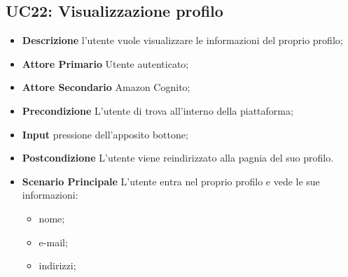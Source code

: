         \subsection{UC22: Visualizzazione profilo}
        \label{sec:UC22}
        \begin{itemize}
            \item \textbf{Descrizione} l'utente vuole visualizzare le informazioni del proprio profilo;
            \item \textbf{Attore Primario} Utente autenticato;
            \item \textbf{Attore Secondario} Amazon Cognito;
            \item \textbf{Precondizione} L'utente di trova all'interno della piattaforma;
            \item \textbf{Input} pressione dell'apposito bottone;
            \item \textbf{Postcondizione} L'utente viene reindirizzato alla pagnia del suo profilo.
            \item \textbf{Scenario Principale} L'utente entra nel proprio profilo e vede le sue informazioni:
            \begin{itemize}
                \item nome;
                \item e-mail;
                \item indirizzi;
            \end{itemize}
        \end{itemize}

